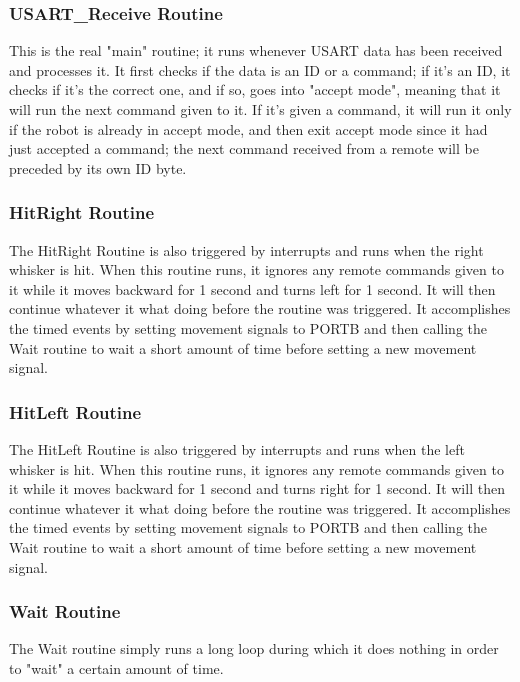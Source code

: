 \documentclass[12pt,letterpaper]{article}
\begin{document}
\subsubsection{USART\_Receive Routine}

This is the real "main" routine; it runs whenever USART data has been received
and processes it.  It first checks if the data is an ID or a command; if it's
an ID, it checks if it's the correct one, and if so, goes into "accept mode",
meaning that it will run the next command given to it.  If it's given a
command, it will run it only if the robot is already in accept mode, and then
exit accept mode since it had just accepted a command; the next command
received from a remote will be preceded by its own ID byte.

\subsubsection{HitRight Routine}

The HitRight Routine is also triggered by interrupts and runs when the right
whisker is hit.  When this routine runs, it ignores any remote commands given
to it while it moves backward for 1 second and turns left for 1 second.  It
will then continue whatever it what doing before the routine was triggered.  It
accomplishes the timed events by setting movement signals to PORTB and then
calling the Wait routine to wait a short amount of time before setting a new
movement signal.

\subsubsection{HitLeft Routine}

The HitLeft Routine is also triggered by interrupts and runs when the left
whisker is hit.  When this routine runs, it ignores any remote commands given
to it while it moves backward for 1 second and turns right for 1 second.  It
will then continue whatever it what doing before the routine was triggered.  It
accomplishes the timed events by setting movement signals to PORTB and then
calling the Wait routine to wait a short amount of time before setting a new
movement signal.

\subsubsection{Wait Routine}

The Wait routine simply runs a long loop during which it does nothing in order
to "wait" a certain amount of time.
\end{document}
